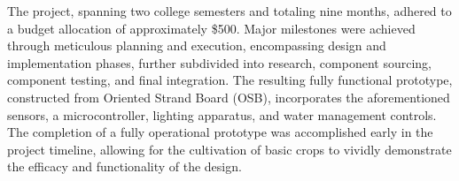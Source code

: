 \documentclass[12pt]{article}
\newcommand{\comment}[1]{} %
\begin{document}
The project, spanning two college semesters and totaling nine months, adhered to a budget allocation of approximately \$500. Major milestones were achieved through meticulous planning and execution, encompassing design and implementation phases, further subdivided into research, component sourcing, component testing, and final integration. The resulting fully functional prototype, constructed from Oriented Strand Board (OSB), incorporates the aforementioned sensors, a microcontroller, lighting apparatus, and water management controls. The completion of a fully operational prototype was accomplished early in the project timeline, allowing for the cultivation of basic crops to vividly demonstrate the efficacy and functionality of the design.

\comment{


\section*{Dedication}
\addcontentsline{toc}{section}{Dedication}
\lipsum[1] %


}

\comment {


\section*{Acknowledgment}
\addcontentsline{toc}{section}{Acknowledgment}
\lipsum[1] %

}

\tableofcontents
\pagebreak

\listoftables
\pagebreak

\listoffigures
\pagebreak

\end{document}
